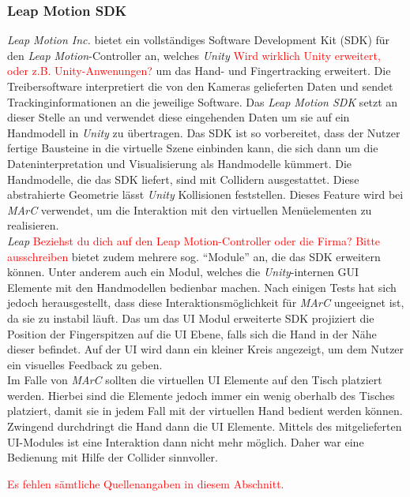 \subsubsection{Leap Motion SDK} \label{sec:LeapSDK}
\textit{Leap Motion Inc.} bietet ein vollständiges Software Development Kit (SDK) für den \textit{Leap Motion}-Controller an, welches \textit{Unity} \textcolor{red}{Wird wirklich Unity erweitert, oder z.B. Unity-Anwenungen?} um das Hand- und Fingertracking erweitert. Die Treibersoftware interpretiert die von den Kameras gelieferten Daten und sendet Trackinginformationen an die jeweilige Software. Das \textit{Leap Motion SDK} setzt an dieser Stelle an und verwendet diese eingehenden Daten um sie auf ein Handmodell in \textit{Unity} zu übertragen. Das SDK ist so vorbereitet, dass der Nutzer fertige Bausteine in die virtuelle Szene einbinden kann, die sich dann um die Dateninterpretation und Visualisierung als Handmodelle kümmert. Die Handmodelle, die das SDK liefert, sind mit Collidern ausgestattet. Diese abstrahierte Geometrie lässt \textit{Unity} Kollisionen feststellen. Dieses Feature wird bei \textit{MArC} verwendet, um die Interaktion mit den virtuellen Menüelementen zu realisieren.\\

\textit{Leap} \textcolor{red}{Beziehst du dich auf den Leap Motion-Controller oder die Firma? Bitte ausschreiben} bietet zudem mehrere sog.  "`Module"'  an, die das SDK erweitern können. Unter anderem auch ein Modul, welches die \textit{Unity}-internen GUI Elemente mit den Handmodellen bedienbar machen. Nach einigen Tests hat sich jedoch herausgestellt, dass diese Interaktionsmöglichkeit für \textit{MArC} ungeeignet ist, da sie zu instabil läuft. Das um das UI Modul erweiterte SDK projiziert die Position der Fingerspitzen auf die UI Ebene, falls sich die Hand in der Nähe dieser befindet. Auf der UI wird dann ein kleiner Kreis angezeigt, um dem Nutzer ein visuelles Feedback zu geben.\\
Im Falle von \textit{MArC} sollten die virtuellen UI Elemente auf den Tisch platziert werden. Hierbei sind die Elemente jedoch immer ein wenig oberhalb des Tisches platziert, damit sie in jedem Fall mit der virtuellen Hand bedient werden können. Zwingend durchdringt die Hand dann die UI Elemente. Mittels des mitgelieferten UI-Modules ist eine Interaktion dann nicht mehr möglich. Daher war eine Bedienung mit Hilfe der Collider sinnvoller.

\textcolor{red}{Es fehlen sämtliche Quellenangaben in diesem Abschnitt.}


\newpage